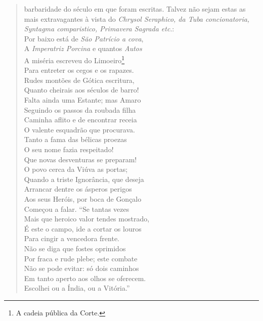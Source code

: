 \begin{verse}
{barbaridade do século em que foram escritas. Talvez não sejam estas as mais
extravagantes à vista do \textit{Chrysol Seraphico, da Tuba concionatoria,
Syntagma comparistico, Primavera Sagrada etc}.}:\\
Por baixo está de \textit{São Patrício a cova},\\
A \textit{Imperatriz Porcina} e quantos \textit{Autos}\\
A miséria escreveu do Limoeiro\footnote{ A cadeia pública da Corte.}\\
Para entreter os cegos e os rapazes.\\
Rudes montões de Gótica escritura,\\		\index{\Gotic}
Quanto cheirais aos séculos de barro!\\
Falta ainda uma Estante; mas Amaro\\
Seguindo os passos da roubada filha\\
Caminha aflito e de encontrar receia\\
O valente esquadrão que procurava.\\
Tanto a fama das bélicas proezas\\
O seu nome fazia respeitado! \\[10pt]


Que novas desventuras se preparam!\\
O povo cerca da Viúva as portas;\\
Quando a triste Ignorância, que deseja\\			\index{\Ignor}
Arrancar dentre os ásperos perigos\\
Aos seus Heróis, por boca de Gonçalo\\
Começou a falar. ``Se tantas vezes\\
Mais que heroico valor tendes mostrado,\\		\index{\Heroic}
É este o campo, ide a cortar os louros\\		\index{\Lour}
Para cingir a vencedora frente.\\
Não se diga que fostes oprimidos\\
Por fraca e rude plebe; este combate\\
Não se pode evitar: só dois caminhos\\
Em tanto aperto aos olhos se oferecem.\\
Escolhei ou a Índia, ou a Vitória.'' \\[10pt]



\end{verse}
